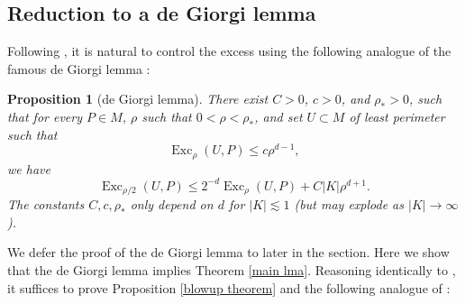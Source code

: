 \documentclass[reqno,10pt]{amsart}
\DeclareMathOperator{\Exc}{Exc}
\newtheorem{proposition}[theorem]{Proposition}
\theoremstyle{definition}
\numberwithin{equation}{section}
\begin{document}

\subsection{Reduction to a de Giorgi lemma}
Following \cite{Miranda66,Giusti77,deGiorgi61}, it is natural to control the excess using the following analogue of the famous de Giorgi lemma \cite[Teorema 5.7]{Miranda66}:

\begin{proposition}[de Giorgi lemma]\label{de Giorgi}
There exist $C > 0$, $c > 0$, and $\rho_* > 0$, such that for every $P \in M$, $\rho$ such that $0 < \rho < \rho_*$, and set $U \subset M$ of least perimeter such that 
$$\Exc_\rho(U, P) \leq c\rho^{d - 1},$$
we have 
\begin{equation}\label{dGL concl}
\Exc_{\rho/2}(U, P) \leq 2^{-d} \Exc_\rho(U, P) + C|K|\rho^{d + 1}.
\end{equation}
The constants $C, c, \rho_*$ only depend on $d$ for $|K| \lesssim 1$ (but may explode as $|K| \to \infty$).
\end{proposition}

We defer the proof of the de Giorgi lemma to later in the section. 
Here we show that the de Giorgi lemma implies Theorem \ref{main lma}.
Reasoning identically to \cite[Chapters 8-9]{Giusti77}, it suffices to prove Proposition \ref{blowup theorem} and the following analogue of \cite[Theorem 8.2]{Giusti77}:
\end{document}
